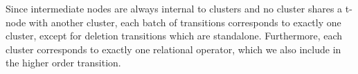 Since intermediate nodes are always internal to clusters and no
cluster shares a t-node with another cluster, each batch of
transitions corresponds to exactly one cluster, except for deletion
transitions which are standalone. Furthermore, each cluster
corresponds to exactly one relational operator, which we also include
in the higher order transition.

\begin{comment}
\subsection{AST to literal code}

In fludb the C++ AST is converted to a literal code string. This is
done in two steps:

\begin{itemize}
\item Translation of the AST into fragments of soft literal code, that
is code in a format similar to that of a string, which has the
property to maintain the uniqueness of symbols under concatenation.
\item Concatenation of soft code fragments and translation to a literal
string representing the C++ code.
\end{itemize}

This is done by the \hask{Codegen} typeclass. Any type implementing
Codegen can be transformed to an IsCode type. IsCode is any type that
can be directly converted into a string of C++ code. For now consider
that IsCode only refers to normal strings. In this section we will
look at the transformation of a valid AST into code.

  \subsubsection{Code hygene}

  A major concern in any transpiler, or code generation system generally,
  is the generation of unique symbols. The problem is similar to the one
  regarding scheme’s hygienic macros, although the problems for those
  are much more complex than our particular case. This is mostly because
  our plans expand to a different language and expansion happens exactly
  once. Consider the following C++ AST that we want to transform into
  code.

  \[
    R_1 \Join_{\theta} R_2
  \]

  The most naive and straightforward way is to convert it directly into
  a C++ string generating symbols deterministically based on the symbols
  used in the query.


\end{comment}
